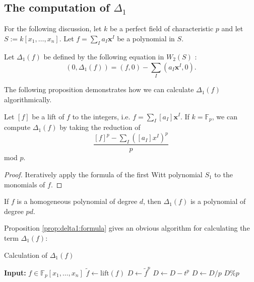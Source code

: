 \subsection{The computation of \(\Delta_{1}\)}

For the following discussion, 
let \(k\) be a perfect field of characteristic \(p\) and 
let \(S := k[x_{1}, \ldots, x_{n}]\).
Let \(f = \sum_{I}^{} a_{I}\mathbf{x}^{I}\) be a polynomial in \(S\).

\begin{defn}
	Let \(\Delta_{1}(f)\)
	be defined by the following equation in \(W_{2}(S)\) :
	\[
		(0, \Delta_{1}(f)) = (f,0) - \sum_{I}^{} (a_{I}\mathbf{x}^{I}, 0) 
	.\] 
\end{defn}

The following proposition demonstrates how we can calculate 
\(\Delta_{1}(f)\) algorithmically.

\begin{prop}
	\label{prop:delta1:formula}
	Let \([f]\) be a lift of \(f\) to the integers,
	i.e.
	\(f = \sum_{I}^{} [a_{I}] \mathbf{x}^{I}\).
	If \(k = \mathbb{F}_{p}\),
	we can compute \(\Delta_{1}(f)\) by 
	taking the reduction of
	\[
		\frac{[f]^{p} - \sum_{I}^{} ([a_{I}]x^{I})^{p} }{p}
	\] 
	mod \(p\).
\end{prop}

\begin{proof}
	Iteratively apply the formula of the first
	Witt polynomial \(S_{1}\) 
	to the monomials of \(f\).
\end{proof}

\begin{rmk}
	If \(f\) is a homogeneous polynomial of degree \(d\), 
	then \(\Delta_{1}(f)\) is a polynomial of degree \(pd\).
\end{rmk}

Proposition \ref{prop:delta1:formula} gives an obvious algorithm
for calculating the term \(\Delta_{1}(f)\): 

\begin{algorithm}[H]
\caption{Calculation of \(\Delta_{1}(f)\) }
	\label{alg:calc:delta1}
    \begin{algorithmic}[1]
		\State \textbf{Input:} \(f \in \mathbb{F}_{p}[x_{1}, \ldots, x_{n}]\) 
		\State \(\tilde{f} \gets \text{lift}(f)\) 
		\State \(D \gets \tilde{f}^{p}\) 
		    \State \(D \gets D - t^{p}\) 
		\EndFor
		\State \(D \gets D / p\)
		\State \Return \(D \% p\) 
	\end{algorithmic}
\end{algorithm}


